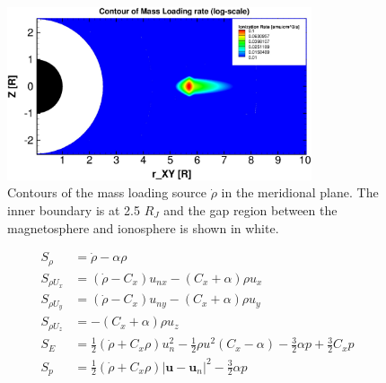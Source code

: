 \begin{figure}
    \centering
    \includegraphics[width=0.8\textwidth]{images2/mass-loading.jpg}
    \caption{Contours of the mass loading source $\dot{\rho}$ in the meridional plane. The inner boundary is at 2.5 $R_J$ and the gap region between the magnetosphere and ionosphere is shown in white.}
    \label{fig:mass-loading}
\end{figure}

\begin{align}
    S_\rho & = \dot{\rho} - \alpha \rho \\
    S_{\rho U_x} & = \left(\dot{\rho} - C_x\right) u_{nx} - \left( C_x + \alpha \right) \rho u_x \\
    S_{\rho U_y} & = \left(\dot{\rho} - C_x\right) u_{ny} - \left( C_x + \alpha \right) \rho u_y \\
    S_{\rho U_z} & = -\left( C_x + \alpha \right) \rho u_z \\
    S_E & = \frac{1}{2} \left( \dot{\rho} + C_x \rho \right) u_n^2 - \frac{1}{2} \rho u^2 \left( C_x - \alpha \right) - \frac{3}{2} \alpha p + \frac{3}{2} C_x p \\
    S_p & = \frac{1}{2} \left( \dot{\rho} + C_x \rho \right) \left| \mathbf{u} - \mathbf{u}_n\right|^2 - \frac{3}{2} \alpha p 
\end{align}

